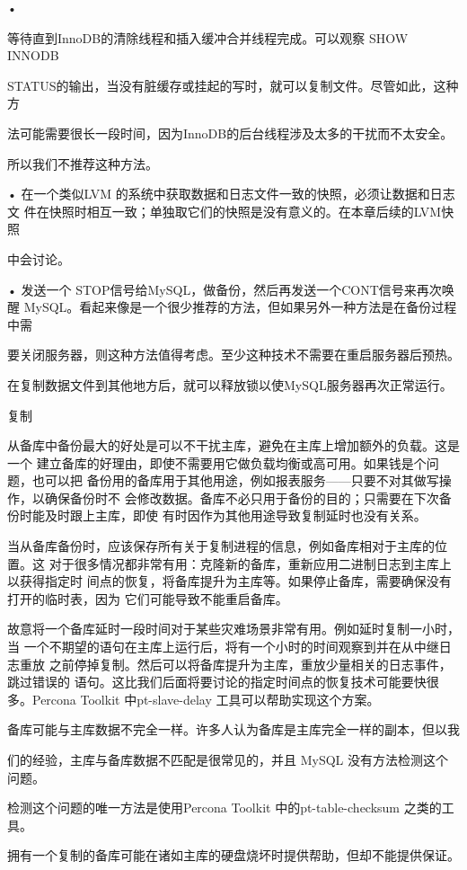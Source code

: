 •

等待直到InnoDB的清除线程和插入缓冲合并线程完成。可以观察 SHOW INNODB

STATUS的输出，当没有脏缓存或挂起的写时，就可以复制文件。尽管如此，这种方

法可能需要很长一段时间，因为InnoDB的后台线程涉及太多的干扰而不太安全。

所以我们不推荐这种方法。

• 在一个类似LVM 的系统中获取数据和日志文件一致的快照，必须让数据和日志文
件在快照时相互一致；单独取它们的快照是没有意义的。在本章后续的LVM快照

中会讨论。

• 发送一个 STOP信号给MySQL，做备份，然后再发送一个CONT信号来再次唤醒
MySQL。看起来像是一个很少推荐的方法，但如果另外一种方法是在备份过程中需

要关闭服务器，则这种方法值得考虑。至少这种技术不需要在重启服务器后预热。

在复制数据文件到其他地方后，就可以释放锁以使MySQL服务器再次正常运行。

复制

从备库中备份最大的好处是可以不干扰主库，避免在主库上增加额外的负载。这是一个
建立备库的好理由，即使不需要用它做负载均衡或高可用。如果钱是个问题，也可以把
备份用的备库用于其他用途，例如报表服务——只要不对其做写操作，以确保备份时不
会修改数据。备库不必只用于备份的目的；只需要在下次备份时能及时跟上主库，即使
有时因作为其他用途导致复制延时也没有关系。

当从备库备份时，应该保存所有关于复制进程的信息，例如备库相对于主库的位置。这
对于很多情况都非常有用：克隆新的备库，重新应用二进制日志到主库上以获得指定时
间点的恢复，将备库提升为主库等。如果停止备库，需要确保没有打开的临时表，因为
它们可能导致不能重启备库。

故意将一个备库延时一段时间对于某些灾难场景非常有用。例如延时复制一小时，当
一个不期望的语句在主库上运行后，将有一个小时的时间观察到并在从中继日志重放
之前停掉复制。然后可以将备库提升为主库，重放少量相关的日志事件，跳过错误的
语句。这比我们后面将要讨论的指定时间点的恢复技术可能要快很多。Percona Toolkit
中pt-slave-delay 工具可以帮助实现这个方案。

备库可能与主库数据不完全一样。许多人认为备库是主库完全一样的副本，但以我

们的经验，主库与备库数据不匹配是很常见的，并且 MySQL 没有方法检测这个问题。

检测这个问题的唯一方法是使用Percona Toolkit 中的pt-table-checksum 之类的工具。

拥有一个复制的备库可能在诸如主库的硬盘烧坏时提供帮助，但却不能提供保证。

